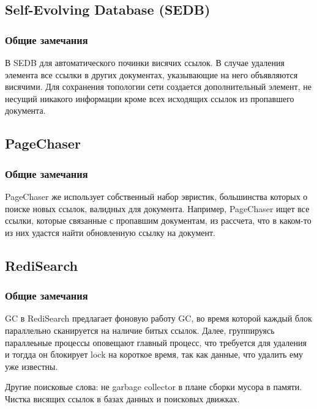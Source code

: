 \subsection{Self-Evolving Database (SEDB)}

\subsubsection{Общие замечания}

В SEDB\cite{SEDB:1998} для автоматического починки висячих ссылок. В случае удаления элемента все ссылки
в других документах, указывающие на него объявляются висячими. Для сохранения топологии
сети создается дополнительный элемент, не несущий никакого информации кроме всех исходящих
ссылок из пропавшего документа.

\subsection{PageChaser}

\subsubsection{Общие замечания}

PageChaser\cite{PageChaser:2009} же использует собственный набор эвристик, большинства которых о поиске новых
ссылок, валидных для документа. Например, PageChaser ищет все ссылки, которые
связанные с пропавшим документам, из рассчета, что в каком-то из них удастся найти обновленную ссылку на документ.

\subsection{RediSearch}

\subsubsection{Общие замечания}

GC в RediSearch\cite{RediSearch:2021} предлагает фоновую работу GC, во время которой каждый блок параллельно
сканируется на наличие битых ссылок. Далее, группируясь параллеьные процессы оповещают
главный процесс, что требуется для удаления и тогдда он блокирует lock на короткое время,
так как данные, что удалить ему уже известны.


Другие поисковые слова: не garbage collector в плане сборки мусора в памяти. Чистка висящих ссылок в базах данных и поисковых движках.